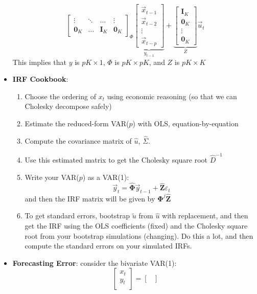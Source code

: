 \documentclass[12pt]{article}
\begin{document}
\begin{itemize}
\[{\begin{bmatrix}
    \vdots & \ddots & \hdots & \vdots \\
    \textbf{0}_K & \hdots & \textbf{I}_K & \textbf{0}_K
    \end{bmatrix}}_{\Phi}\underbrace{\begin{bmatrix}
    \vec{x}_{t-1} \\
    \vec{x}_{t-2} \\
    \vdots \\
    \vec{x}_{t-p}
    \end{bmatrix}}_{y_{t-1}} + \underbrace{\begin{bmatrix}
    \textbf{I}_K \\
    \textbf{0}_K \\
    \vdots \\
    \textbf{0}_K
    \end{bmatrix}}_{Z}\vec{u}_t\]
    This implies that $y$ is $pK\times 1$, $\Phi$ is $pK\times pK$, and $Z$ is $pK \times K$ 
    \item \textbf{IRF Cookbook}:
    \begin{enumerate}
        \item Choose the ordering of $x_t$ using economic reasoning (so that we can Cholesky decompose safely)
        \item Estimate the reduced-form VAR($p$) with OLS, equation-by-equation
        \item Compute the covariance matrix of $\hat{u}$, $\hat{\Sigma}$. 
        \item Use this estimated matrix to get the Cholesky square root $\hat{D}^{-1}$
        \item Write your VAR($p$) as a VAR(1):
        \[\vec{y}_t = \boldsymbol{\hat{\Phi}}\vec{y}_{t-1} + \hat{\textbf{Z}}\varepsilon_t\]
        and then the IRF matrix will be given by $\boldsymbol{\Phi}^j\hat{\textbf{Z}}$
        \item To get standard errors, bootstrap $\widetilde{u}$ from $\hat{u}$ with replacement, and then get the IRF using the OLS coefficients (fixed) and the Cholesky square root from your bootstrap simulations (changing). Do this a lot, and then compute the standard errors on your simulated IRFs.
    \end{enumerate}
    \item \textbf{Forecasting Error}: consider the bivariate VAR(1):
    \[\begin{bmatrix}
    x_t \\
    y_t \\
    \end{bmatrix} = \begin{bmatrix}

\end{bmatrix}\]
\end{itemize}
\end{document}
